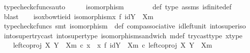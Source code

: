\begin{isabellebody}
\ {\isacharparenleft}{\kern0pt}typecheck{\isacharunderscore}{\kern0pt}cfuncs{\isacharcomma}{\kern0pt}auto{\isacharparenright}{\kern0pt}\isanewline
\ \ \isamarkupfalse%
\ \isamarkupfalse%
\ {\isachardoublequoteopen}isomorphism\ {\isasymphi}{\isachardoublequoteclose}\ \isanewline
\ \ \ \ \isamarkupfalse%
\ {\isasymphi}{\isacharunderscore}{\kern0pt}def\ {\isasymphi}{\isacharunderscore}{\kern0pt}type\ assms{\isacharparenleft}{\kern0pt}{}{\isacharparenright}{\kern0pt}\ is{\isacharunderscore}{\kern0pt}finite{\isacharunderscore}{\kern0pt}def\ \isamarkupfalse%
\ blast\isanewline
\ \ \isamarkupfalse%
\ iso{\isacharunderscore}{\kern0pt}x{\isacharunderscore}{\kern0pt}bowtie{\isacharunderscore}{\kern0pt}id{\isacharcolon}{\kern0pt}\ {\isachardoublequoteopen}isomorphism{\isacharparenleft}{\kern0pt}x\ {\isasymbowtie}\isactrlsub f\ id{\isacharparenleft}{\kern0pt}Y\ {\isasymsetminus}\ {\isacharparenleft}{\kern0pt}X{\isacharcomma}{\kern0pt}m{\isacharparenright}{\kern0pt}{\isacharparenright}{\kern0pt}{\isacharparenright}{\kern0pt}{\isachardoublequoteclose}\isanewline
\ \ \ \ \isamarkupfalse%
\ {\isacharparenleft}{\kern0pt}typecheck{\isacharunderscore}{\kern0pt}cfuncs{\isacharcomma}{\kern0pt}\ smt\ {\isacartoucheopen}isomorphism\ {\isasymphi}{\isacartoucheclose}\ {\isasymphi}{\isacharunderscore}{\kern0pt}def\ comp{\isacharunderscore}{\kern0pt}associative{}\ id{\isacharunderscore}{\kern0pt}left{\isacharunderscore}{\kern0pt}unit{}\ into{\isacharunderscore}{\kern0pt}super{\isacharunderscore}{\kern0pt}iso\ into{\isacharunderscore}{\kern0pt}super{\isacharunderscore}{\kern0pt}try{\isacharunderscore}{\kern0pt}cast\ into{\isacharunderscore}{\kern0pt}super{\isacharunderscore}{\kern0pt}type\ isomorphism{\isacharunderscore}{\kern0pt}sandwich\ m{\isacharunderscore}{\kern0pt}def\ try{\isacharunderscore}{\kern0pt}cast{\isacharunderscore}{\kern0pt}type\ x{\isacharunderscore}{\kern0pt}type{\isacharparenright}{\kern0pt}\isanewline
\ \ \isamarkupfalse%
\ {\isachardoublequoteopen}left{\isacharunderscore}{\kern0pt}coproj\ X\ {\isacharparenleft}{\kern0pt}Y\ {\isasymsetminus}\ {\isacharparenleft}{\kern0pt}X{\isacharcomma}{\kern0pt}m{\isacharparenright}{\kern0pt}{\isacharparenright}{\kern0pt}\ {\isasymcirc}\isactrlsub c\ x\ {\isacharequal}{\kern0pt}\ {\isacharparenleft}{\kern0pt}x\ {\isasymbowtie}\isactrlsub f\ id{\isacharparenleft}{\kern0pt}Y\ {\isasymsetminus}\ {\isacharparenleft}{\kern0pt}X{\isacharcomma}{\kern0pt}m{\isacharparenright}{\kern0pt}{\isacharparenright}{\kern0pt}{\isacharparenright}{\kern0pt}\ {\isasymcirc}\isactrlsub c\ left{\isacharunderscore}{\kern0pt}coproj\ X\ {\isacharparenleft}{\kern0pt}Y\ {\isasymsetminus}\ {\isacharparenleft}{\kern0pt}X{\isacharcomma}{\kern0pt}m{\isacharparenright}{\kern0pt}{\isacharparenright}{\kern0pt}{\isachardoublequoteclose}\isanewline

\end{isabellebody}
